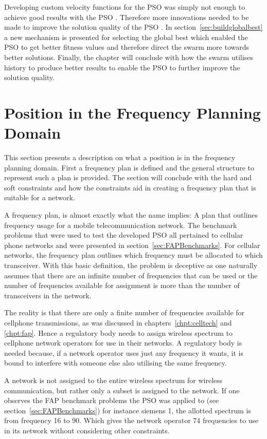 Developing custom velocity functions for the \gls{PSO} was simply not enough to achieve good results with the \gls{PSO} . Therefore more innovations needed to be made to improve the solution quality of the \gls{PSO} . In section~\ref{sec:buildglobalbest} a new mechanism is presented for selecting the global best which enabled the \gls{PSO} to get better fitness values and therefore direct the swarm more towards better solutions. Finally, the chapter will conclude with how the swarm utilises history to produce better results to enable the \gls{PSO} to further improve the solution quality.
\section{Position in the Frequency Planning Domain}
This section presents a description on what a position is in the frequency planning domain. First a frequency plan is defined and the general structure to represent such a plan is provided. The section will conclude with the hard and soft constraints and how the constraints aid in creating a frequency plan that is suitable for a network.

A frequency plan, is almost exactly what the name implies: A plan that outlines frequency usage for a mobile telecommunication network. The benchmark problems that were used to test the developed \gls{PSO} all pertained to cellular phone networks and were presented in section~\ref{sec:FAPBenchmarks}. For cellular networks, the frequency plan outlines which frequency must be allocated to which transceiver. With this basic definition, the problem is deceptive as one naturally assumes that there are an infinite number of frequencies that can be used or the number of frequencies available for assignment is more than the number of transceivers in the network. 

The reality is that there are only a finite number of frequencies available for cellphone transmissions, as was discussed in chapters~\ref{chpt:celltech} and \ref{chpt:fap}. Hence a regulatory body needs to assign wireless spectrum to cellphone network operators for use in their networks. A regulatory body is needed because, if a network operator uses just any frequency it wants, it is bound to interfere with someone else also utilising the same frequency.

A network is not assigned to the entire wireless spectrum for wireless communication, but rather only a subset is assigned to the network. If one observes the \gls{FAP} benchmark problems the \gls{PSO} was applied to (see section~\ref{sec:FAPBenchmarks}) for instance siemens 1, the allotted spectrum is from frequency 16 to 90. Which gives the network operator 74 frequencies to use in its network without considering other constraints. 

